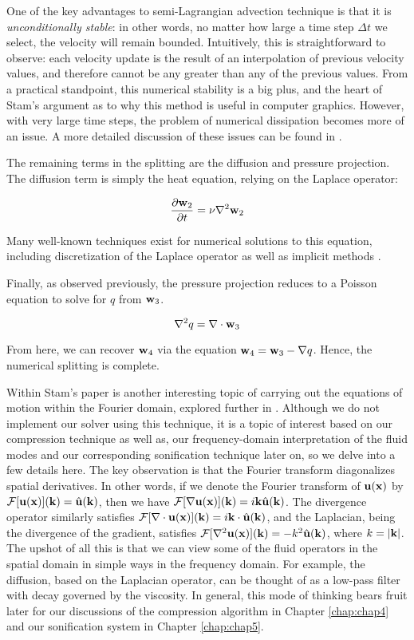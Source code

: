 One of the key advantages to semi-Lagrangian advection technique is that it is {\em unconditionally stable}: in other words, no matter how large a time step $\Delta t$ we select, the velocity will remain bounded. Intuitively, this is straightforward to observe: each velocity update is the result of an interpolation of previous velocity values, and therefore cannot be any greater than any of the previous values. From a practical standpoint, this numerical stability is a big plus, and the heart of Stam's argument as to
why this method is useful in computer graphics. However, with very large time steps, the problem of numerical dissipation becomes more of an issue. A more detailed discussion of these issues can be found in \cite{bridson2015fluid}.

The remaining terms in the splitting are the diffusion and pressure projection. The diffusion term is simply the heat equation, relying on the Laplace operator:

\begin{equation}
\frac{\partial{\mathbf{w}_2}}{\partial{t}} = \nu \nabla^2 \mathbf{w}_2
\end{equation}

Many well-known techniques exist for numerical solutions to this equation, including discretization of the Laplace operator as well as implicit methods \cite{peaceman1955numerical}.

Finally, as observed previously, the pressure projection reduces to a Poisson equation to solve for $q$ from $\mathbf{w}_3$.

\begin{equation}
\nabla^2 q = \nabla \cdot \mathbf{w}_3
\end{equation}

From here, we can recover $\mathbf{w}_4$ via the equation $\mathbf{w}_4 = \mathbf{w}_3 - \nabla q$. Hence, the numerical splitting is complete.

Within Stam's paper is another interesting topic of carrying out the equations of motion within the Fourier domain, explored further in \cite{stam2001simple}. Although 
we do not implement our solver using this technique, it is a topic of interest based on our compression technique as well as,
our frequency-domain interpretation of the fluid modes and our corresponding sonification technique later on, so we delve into a few details here. The key observation is that the Fourier transform diagonalizes spatial derivatives. In other words, if we denote the Fourier transform of $\mathbf{u}(\mathbf{x})$ by $\mathcal{F}[\mathbf{u}(\mathbf{x})](\mathbf{k}) = \hat{\mathbf{u}}(\mathbf{k})$, then we have $\mathcal{F}[\nabla \mathbf{u}(\mathbf{x})](\mathbf{k}) = i \mathbf{k} \hat{\mathbf{u}}(\mathbf{k})$. The divergence operator similarly satisfies $\mathcal{F}[\nabla \cdot \mathbf{u}(\mathbf{x})](\mathbf{k}) = i \mathbf{k} \cdot \hat{\mathbf{u}}(\mathbf{k})$, and the Laplacian, being the divergence of the gradient, satisfies $\mathcal{F}[\nabla^2 \mathbf{u}(\mathbf{x})](\mathbf{k}) = - k^2 \hat{\mathbf{u}}(\mathbf{k})$, where $k = |\mathbf{k}|$. The upshot of all this is that we can view some of the fluid operators in the spatial domain in simple ways in the frequency domain. For example, the diffusion, based on the Laplacian operator, can be thought of as a low-pass filter with decay governed by the viscosity. In general, this mode of
thinking bears fruit later for our discussions of the compression algorithm in Chapter \ref{chap:chap4} and our sonification system in Chapter \ref{chap:chap5}.

